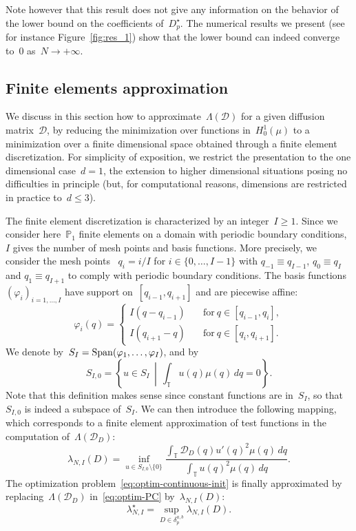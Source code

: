 \documentclass{article}
\newcommand{\dps}{\displaystyle }
\renewcommand{\leq}{\leqslant}
\renewcommand{\geq}{\geqslant}
\def\T{\mathbb{T}}
\newcommand{\Diff}{\mathcal{D}}
\newcommand{\Df}{\mathscr{D}}
\newcommand{\diff}{D}
\newcommand{\diffset}{\delta}
\renewcommand{\dim}{d}
\begin{document}
Note however that this result does not give any information on the behavior of the lower bound on the coefficients of~$D_p^\star$. The numerical results we present (see for instance Figure~\ref{fig:res_1}) show that the lower bound can indeed converge to~0 as~$N \to +\infty$.

\subsection{Finite elements approximation}
\label{subsec:FE}

We discuss in this section how to approximate~$\Lambda(\Diff)$ for a given diffusion matrix~$\Diff$, by reducing the minimization over functions in~$H^1_0(\mu)$ to a minimization over a finite dimensional space obtained through a finite element discretization. For simplicity of exposition, we restrict the presentation to the one dimensional case~$\dim=1$, the extension to higher dimensional situations posing no difficulties in principle (but, for computational reasons, dimensions are restricted in practice to~$\dim \leq 3$).

The finite element discretization is characterized by an integer~$I\geq 1$. Since we consider here~$\mathbb{P}_1$ finite elements on a domain with periodic boundary conditions, $I$ gives the number of mesh points and basis functions. More precisely, we consider the mesh points~ $q_i = i/I$ for $i\in\{0,\ldots,I-1\}$ with $q_{-1} \equiv q_{I-1}$, $q_0 \equiv q_{I}$ and $q_1 \equiv q_{I+1}$ to comply with periodic boundary conditions. The basis functions~$(\varphi_i)_{i=1,\dots,I}$ have support on~$[q_{i-1},q_{i+1}]$ and are piecewise affine:
\[
\varphi_i(q) =
\left\{ \begin{aligned}
  I(q-q_{i-1}) & \quad \text{for} \ q\in[q_{i-1},q_i], \\
  I(q_{i+1}-q) & \quad \text{for} \ q\in[q_{i},q_{i+1}].
\end{aligned} \right.
\]
We denote by~$S_I={\rm Span} (\varphi_1, \ldots, \varphi_I)$, and by 
\[
S_{I,0} = \left\{u \in S_I \, \middle| \, \int_{\T} u(q) \mu(q)\,dq = 0 \right\}.
\]
Note that this definition makes sense since constant functions are in~$S_I$, so that~$S_{I,0}$ is indeed a subspace of~$S_I$. We can then introduce the following mapping, which corresponds to a finite element approximation of test functions in the computation of~$\Lambda(\mathscr{D}_\diff)$:
\begin{equation}
  \label{eq:lambda-FE}
  \lambda_{N,I}(\diff) = \inf_{u \in S_{I,0} \setminus\{0\}} \frac{\dps \int_{\T} \Df_\diff(q) u'(q)^2 \mu(q)\,dq}{\dps \int_{\T} u(q)^2 \mu(q)\,dq}.
\end{equation}
The optimization problem~\eqref{eq:optim-continuous-init} is finally approximated by replacing~$\Lambda(\mathscr{D}_\diff)$ in~\eqref{eq:optim-PC} by~$\lambda_{N,I}(\diff)$:
\begin{equation}
  \label{eq:optim-FE}
  \lambda_{N,I}^{\star} = \sup_{\diff\in\diffset_p^{a,b}} \lambda_{N,I}(\diff).
\end{equation}
\end{document}
